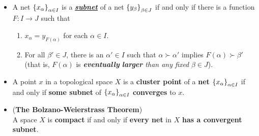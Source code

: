 \documentclass[11pt]{article}
\begin{document}
\begin{itemize}
\item \begin{definition}
A net  $\left\{x_\alpha\right\}_{\alpha \in I}$ is a \underline{\emph{\textbf{subnet}}} of a net  $\left\{y_\beta\right\}_{\beta \in J}$ if and only if there is
a function $F: I \rightarrow J$ such that
\begin{enumerate}
\item $x_\alpha = y_{F(\alpha)}$ for each $\alpha \in I$.
\item For all $\beta' \in J$, there is an $\alpha' \in I$ such that $\alpha \succ \alpha'$ implies $F(\alpha) \succ \beta'$ (that is,
$F(\alpha)$ is \emph{\textbf{eventually} \textbf{larger} than any fixed} $\beta \in J$).
\end{enumerate}
\end{definition}

\item \begin{proposition}
A point $x$ in a topological space $X$ is a \textbf{cluster point} of a \textbf{net} $\left\{x_\alpha\right\}_{\alpha \in I}$ if and only if \textbf{some subnet} of $\left\{x_\alpha\right\}_{\alpha \in I}$ \textbf{converges} to $x$.
\end{proposition}

\item \begin{theorem} (\textbf{The Bolzano-Weierstrass Theorem}) \citep{reed1980methods} \\
A space $X$ is \textbf{compact} if and only if \textbf{every net} in $X$ \textbf{has a convergent subnet}.
\end{theorem}
\end{itemize}
\end{document}
